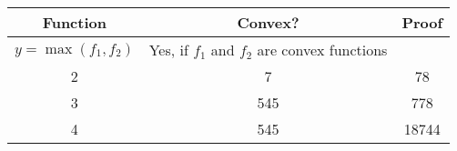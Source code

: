 \documentclass{article}
\begin{document}
\begin{center}
    \begin{tabular}{||c | c | c||} 
     \hline
     Function & Convex? & Proof \\ [0.5ex] 
     \hline\hline
     $y = \max(f_1, f_2)$ & Yes, if $f_1$ and $f_2$ are convex functions & \\ 
     \hline
     2 & 7 & 78 \\
     \hline
     3 & 545 & 778 \\
     \hline
     4 & 545 & 18744 \\
     \hline
    \end{tabular}
\end{center}
\end{document}
